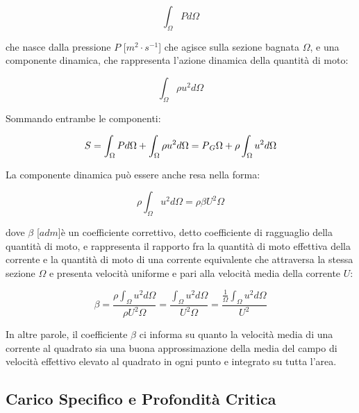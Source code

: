 \documentclass[12pt]{article} %
\begin{document}
\begin{equation}
   \int_{\Omega}^{} Pd\Omega
   \label{eqn:S_comp_statica}
\end{equation}

\noindent che nasce dalla pressione $P$ [$m^2\cdot s^{-1}$] che agisce sulla sezione bagnata $\Omega$, e una componente dinamica, che rappresenta l’azione dinamica della quantità di moto:

\begin{equation}
   \int_{\Omega}^{} \rho u^{2}d\Omega
   \label{eqn:S_comp_dinamica}
\end{equation}

\noindent Sommando entrambe le componenti:   

\begin{equation}
   S=\int_{\Omega}^{} Pd\Omega+\int_{\Omega}^{} \rho u^{2}d\Omega=P\textsubscript{$G$}\Omega+\rho\int_{\Omega}^{} u^{2}d\Omega
   \label{eqn:S}
\end{equation}

\noindent La componente dinamica può essere anche resa nella forma:

\begin{equation}
    \rho\int_{\Omega}^{} u^{2}d\Omega=\rho\beta U^{2}\Omega
    \label{eqn:comp_dinamica_beta}
\end{equation}

\noindent dove $\beta$ [$adm$]è un coefficiente correttivo, detto coefficiente di ragguaglio della quantità di moto, e rappresenta il rapporto fra la quantità di moto effettiva della corrente e la quantità di moto di una corrente equivalente che attraversa la stessa sezione $\Omega$ e presenta velocità uniforme e pari alla velocità media della corrente $U$: 

\begin{equation}
   \beta=\frac{\rho \int_{\Omega}^{} u^{2}d\Omega}{\rho U^{2}\Omega}=\frac{\int_{\Omega}^{} u^{2}d\Omega}{U^{2}\Omega}=\frac{\frac{1}{\Omega}\int_{\Omega}^{} u^{2}d\Omega}{U^{2}}
   \label{eqn:beta}
\end{equation}

\noindent In altre parole, il coefficiente $\beta$ ci informa su quanto la velocità media di una corrente al quadrato sia una buona approssimazione della media del campo di velocità effettivo elevato al quadrato in ogni punto e integrato su tutta l’area.

\subsection{Carico Specifico e Profondità Critica}
\end{document}
